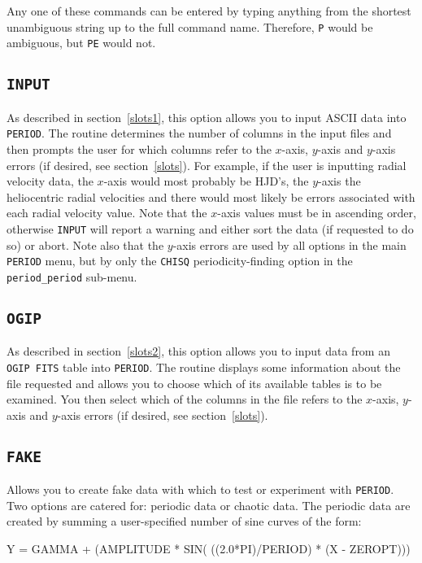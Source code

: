 \documentclass[twoside,11pt,noabs,nolof]{starlink}
\begin{document}
Any one of these commands can be entered by typing anything from the shortest
unambiguous string up to the full command name. Therefore, \texttt{P} would be
ambiguous, but \texttt{PE} would not.

\subsection*{\texttt{INPUT}}

As described in section~\ref{slots1}, this option allows you to input
ASCII data into \texttt{PERIOD}. The routine determines the number of
columns in the input files and then prompts the user for which columns
refer to the $x$-axis, $y$-axis and $y$-axis errors (if desired, see
section~\ref{slots}). For example, if the user is inputting radial
velocity data, the $x$-axis would most probably be HJD's, the $y$-axis
the heliocentric radial velocities and there would most likely be
errors associated with each radial velocity value. Note that the
$x$-axis values must be in ascending order, otherwise \texttt{INPUT} will
report a warning and either sort the data (if requested to do so) or
abort.  Note also that the $y$-axis errors are used by all options in
the main \texttt{PERIOD} menu, but by only the \texttt{CHISQ}
periodicity-finding option in the \texttt{period\_period} sub-menu.

\subsection*{\texttt{OGIP}}

As described in section~\ref{slots2}, this option allows you to input data
from an \texttt{OGIP FITS} table
into \texttt{PERIOD}. The routine displays some information about
the file requested and allows you to choose which of its available
tables is to be examined. You then select which of the columns in the file
refers to the $x$-axis,
$y$-axis and $y$-axis errors (if desired, see section~\ref{slots}).

\subsection*{\texttt{FAKE}}

Allows you to create fake data with which to test or experiment with \texttt{PERIOD}. Two options are catered for: periodic data or chaotic data. The
periodic data are created by summing a user-specified number of sine curves of
the form:

\begin{terminalv}
Y = GAMMA + (AMPLITUDE * SIN( ((2.0*PI)/PERIOD) * (X - ZEROPT)))
\end{terminalv}
\end{document}
